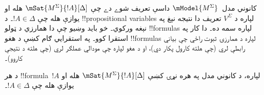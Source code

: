 \documentclass[../../../include/open-logic-section]{subfiles}
\begin{document}


کانوني مدل~$\mModel{M^\Sigma}$ داسې تعريف شوے دے چې
$\mSat{M^\Sigma}{!A}[\Delta]$ هله او يوازې هله چې $!A \in \Delta$۔ د !!{propositional
variable}s لپاره د $V^\Sigma$ تعريف دا نتيجه نېغ په نېغه ورکوي۔ خو بايد
وښيو چې دا همارزي د ټولو !!{formula}s لپاره سمه ده۔ دا کار په استقرا کوو۔
په استقرايي ګام کښې د هغو !!{formula}s لپاره د همارزۍ ثبوت راځي چې بياني
رابطې لري (چې هلته  کارول پکار دي)، او د هغو لپاره
چې مودالي عملګر لري (چې هلته د  نتيجې کاروو)۔

\begin{prop}
  د هر !!{formula}~$!A$ لپاره، د کانوني مدل په هره نړۍ کښې
  $\mSat{M^\Sigma}{!A}[\Delta]$ هله او يوازې هله چې
  $!A \in \Delta$۔
\end{prop}
\end{document}

